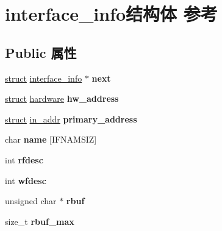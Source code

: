 \hypertarget{structinterface__info}{}\section{interface\+\_\+info结构体 参考}
\label{structinterface__info}
\subsection*{Public 属性}
\begin{DoxyCompactItemize}
\item 
\mbox{\label{structinterface__info_a0a7e6ef558535f0d2786145a1b0410b2}} 
\hyperlink{interfacestruct}{struct} \hyperlink{structinterface__info}{interface\+\_\+info} $\ast$ {\bfseries next}
\item 
\mbox{\label{structinterface__info_a5092eb7788f8e94a5c441b7f70c6fef5}} 
\hyperlink{interfacestruct}{struct} \hyperlink{structhardware}{hardware} {\bfseries hw\+\_\+address}
\item 
\mbox{\label{structinterface__info_ab5a1c2018486c6c6f3cf37b2490a5e5b}} 
\hyperlink{interfacestruct}{struct} \hyperlink{structin__addr}{in\+\_\+addr} {\bfseries primary\+\_\+address}
\item 
\mbox{\label{structinterface__info_a03720ef87f336bc8d32c76723bbdc952}} 
char {\bfseries name} \mbox{[}I\+F\+N\+A\+M\+S\+IZ\mbox{]}
\item 
\mbox{\label{structinterface__info_a2731a6327a92c1b48701b685dbc8bf61}} 
int {\bfseries rfdesc}
\item 
\mbox{\label{structinterface__info_a9207c0d11af3809e89a0f16698ba8ba3}} 
int {\bfseries wfdesc}
\item 
\mbox{\label{structinterface__info_a7c25c7ac82442698714ca637ce2d31d4}} 
unsigned char $\ast$ {\bfseries rbuf}
\item 
\mbox{\label{structinterface__info_ab960c932035d0c181157db525ecb52bc}} 
size\+\_\+t {\bfseries rbuf\+\_\+max}
\item 

\end{DoxyCompactItemize}
